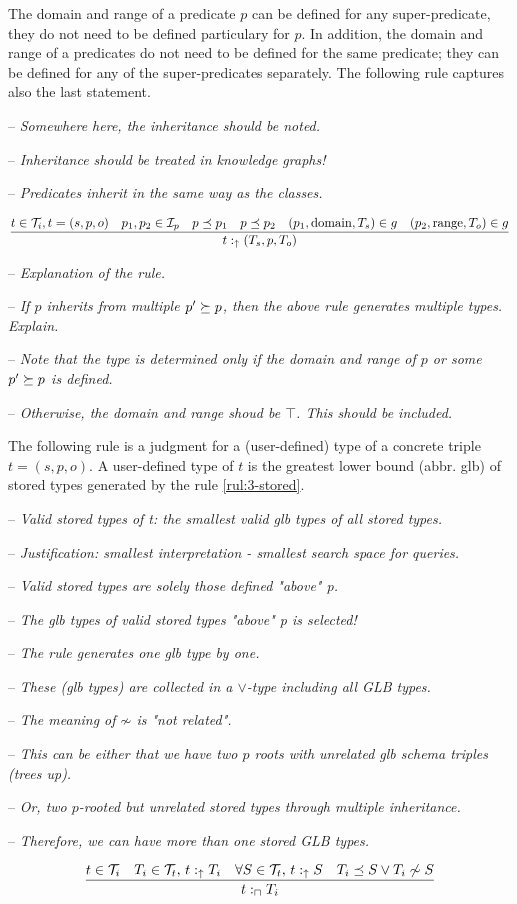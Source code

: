 \documentclass[runningheads]{llncs}
\newcommand{\uarr}{\uparrow}
\newcommand{\I}{{\cal I}}
\newcommand{\T}{{\cal T}}
\newcommand{\Ti}{{\cal T}_i}
\newcommand{\notes}[1]{\noindent\begin{small}-- \emph{#1}\\\end{small}}
\begin{document}
The domain and range of a predicate $p$ can be defined for any
super-predicate, they do not need to be defined particulary for
$p$. In addition, the domain and range of a predicates do not need to
be defined for the same predicate; they can be defined for any of the
super-predicates separately. The following rule captures also the last
statement.

\medskip
\notes{Somewhere here, the inheritance should be noted.}
\notes{Inheritance should be treated in knowledge graphs!}
\notes{Predicates inherit in the same way as the classes.}

\begin{equation}
\label{rul:3-stored1}
\dfrac{t\in\Ti, t=(s,p,o)\quad p_1,p_2\in\I_p\quad p\preceq\/p_1\quad p\preceq\/p_2\quad (p_1,\text{domain},T_s)\in\/g
                \quad (p_2,\text{range},T_o)\in\/g}
      {t:_\uarr(T_s,p,T_o)}
\end{equation}

\notes{Explanation of the rule.}
\notes{If $p$ inherits from multiple $p'\succeq\/p$, then the above rule generates multiple types. Explain.}
\notes{Note that the type is determined only if the domain and range of $p$ or some $p'\succeq\/p$ is defined.}
\notes{Otherwise, the domain and range shoud be $\top$. This should be included.}

The following rule is a judgment for a (user-defined) type of a
concrete triple $t=(s,p,o)$. A user-defined type of $t$ is the
greatest lower bound (abbr. glb) of stored types generated by the rule
\ref{rul:3-stored}.

\medskip
\notes{Valid stored types of t: the smallest valid glb types of all stored types.}
\notes{Justification: smallest interpretation - smallest search space for queries.}
\notes{Valid stored types are solely those defined "above" p.}
\notes{The glb types of valid stored types "above" p is selected!}
\notes{The rule generates one glb type by one.}
\notes{These (glb types) are collected in a $\lor$-type including all GLB types.}

\notes{The meaning of $\not\sim$ is "\emph{not related}".}
\notes{This can be either that we have two $p$ roots with unrelated glb schema triples (trees up).}
\notes{Or, two $p$-rooted but unrelated stored types through multiple inheritance.}
\notes{Therefore, we can have more than one stored GLB types.}

\begin{equation}
\dfrac{t\in\T_i\quad T_i\in\T_t,\, t:_\uarr\/T_i\quad \forall\/S\in\T_t,\, t:_\uarr\/S\quad T_i\preceq\/S\lor\/T_i\not\sim\/S}
      {t:_\sqcap\/T_i}
\end{equation}
\end{document}
